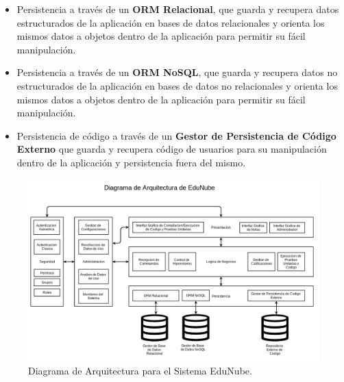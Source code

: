 \begin{itemize}
    \begin{itemize}
    	\item Persistencia a través de un \textbf{ORM Relacional}, que guarda y recupera datos estructurados de la aplicación en bases de datos relacionales y orienta los mismos datos a objetos dentro de la aplicación para permitir su fácil manipulación.
        \item Persistencia a través de un \textbf{ORM NoSQL}, que guarda y recupera datos no estructurados de la aplicación en bases de datos no relacionales y orienta los mismos datos a objetos dentro de la aplicación para permitir su fácil manipulación.
        \item Persistencia de código a través de un \textbf{Gestor de Persistencia de Código Externo} que guarda y recupera código de usuarios para su manipulación dentro de la aplicación y persistencia fuera del mismo.
    \end{itemize}
\end{itemize}

\begin{landscape}
	\begin{figure}
	  \begin{center}
	    \includegraphics[width=1.0\textwidth]{Figures/arq_en.png}
	  \end{center}
	  \caption{Diagrama de Arquitectura para el Sistema EduNube.}
	  \label{arq_en}
	\end{figure}

\end{landscape}

